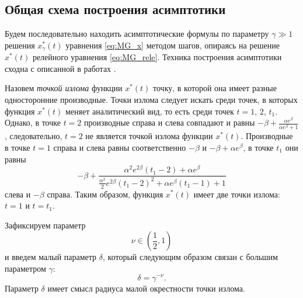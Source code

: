\subsection{Общая схема построения асимптотики}
Будем последовательно находить асимптотические формулы по параметру $\gamma \gg 1$ решения $x_{\gamma}^*(t)$ уравнения \eqref{eq:MG_x} методом шагов, опираясь на решение $x^*(t)$ релейного уравнения \eqref{eq:MG_rele}. Техника построения асимптотики сходна с описанной в работах \cite{Kolesov2010, Glyzin2013}.

Назовем \textit{точкой излома} функции $x^*(t)$ точку, в которой она имеет разные односторонние производные. Точки излома следует искать среди точек, в которых функция $x^*(t)$ меняет аналитический вид, то есть среди точек $t = 1$, $2$, $t_1$. Однако, в точке $t = 2$ производные справа и слева совпадают и равны $-\beta+\frac{\alpha e^{\beta}}{\alpha e^{\beta}+1}$, следовательно, $t = 2$ не является точкой излома функции $x^*(t)$. Производные в точке $t = 1$ справа и слева равны соответственно $-\beta$ и $-\beta + \alpha e^\beta$, в точке $t_1$ они равны
%
$$-\beta + \frac{\alpha^2 e^{2\beta}(t_1 - 2) + \alpha e^\beta}{\frac{\alpha^2}{2} e^{2\beta}(t_1-2)^2+\alpha e^{\beta}(t_1 - 1) + 1}$$
%
слева и $-\beta$ справа. 
Таким образом, функция $x^*(t)$ имеет две точки излома: $t = 1$ и $t = t_1$.

Зафиксируем параметр
%
\begin{equation}
	\label{eq:nu_small}
	\nu \in \left( \frac{1}{2}, 1 \right)
\end{equation}
%
и введем малый параметр $\delta$, который следующим образом связан с большим параметром $\gamma$:  
%
\[\delta=\gamma^{-\nu}.\]
%
Параметр $\delta$ имеет смысл радиуса малой окрестности точки излома.

